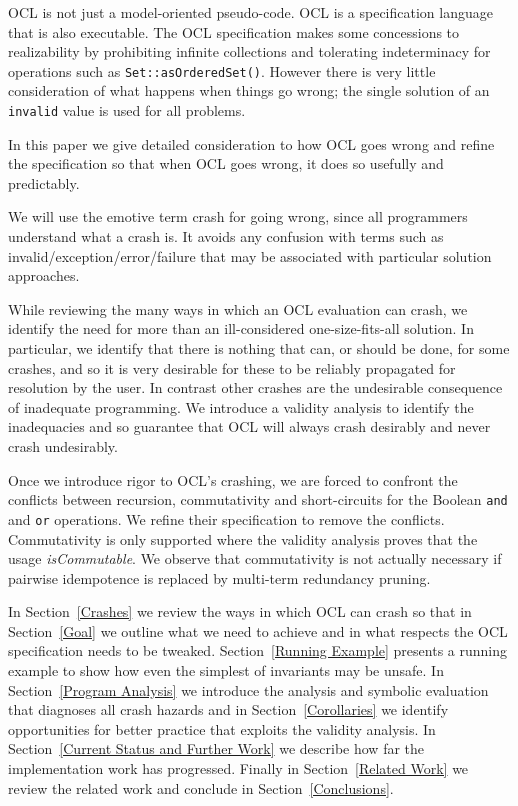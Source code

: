 \documentclass[
]{ceurart}
\begin{document}
OCL is not just a model-oriented pseudo-code. OCL is a specification language that is also executable. The OCL specification makes some concessions to realizability by prohibiting infinite collections and tolerating indeterminacy for operations such as \verb|Set::asOrderedSet()|. However there is very little consideration of what happens when things go wrong; the single solution of an \verb|invalid| value is used for all problems.

In this paper we give detailed consideration to how OCL goes wrong and refine the specification so that when OCL goes wrong, it does so usefully and predictably.

We will use the emotive term crash for going wrong, since all programmers understand what a crash is. It avoids any confusion with terms such as invalid/exception/error/failure that may be associated with particular solution approaches.

While reviewing the many ways in which an OCL evaluation can crash, we identify the need for more than an ill-considered one-size-fits-all solution. In particular, we identify that there is nothing that can, or should be done, for some crashes, and so it is very desirable for these to be reliably propagated for resolution by the user. In contrast other crashes are the undesirable consequence of inadequate programming. We introduce a validity analysis to identify the inadequacies and so guarantee that OCL will always crash desirably and never crash undesirably.

Once we introduce rigor to OCL's crashing, we are forced to confront the conflicts between recursion, commutativity and short-circuits for the Boolean \verb|and| and \verb|or| operations. We refine their specification to remove the conflicts. Commutativity is only supported where the validity analysis proves that the usage \emph{isCommutable}. We observe that commutativity is not actually necessary if pairwise idempotence is replaced by multi-term redundancy pruning.

In Section~\ref{Crashes} we review the ways in which OCL can crash so that in Section~\ref{Goal} we outline what we need to achieve and in what respects the OCL specification needs to be tweaked. Section~\ref{Running Example} presents a running example to show how even the simplest of invariants may be unsafe. In Section~\ref{Program Analysis} we introduce the analysis and symbolic evaluation that diagnoses all crash hazards and in Section~\ref{Corollaries} we identify opportunities for better practice that exploits the validity analysis. In Section~\ref{Current Status and Further Work} we describe how far the implementation work has progressed.  Finally in Section~\ref{Related Work} we review the related work and conclude in Section~\ref{Conclusions}.
\end{document}
